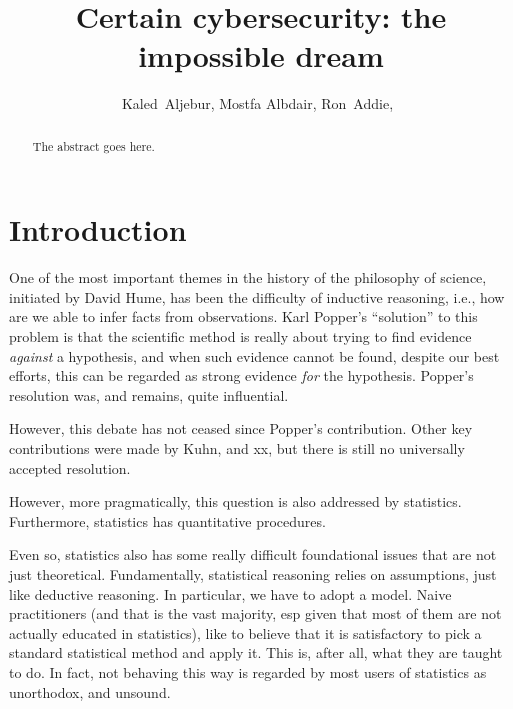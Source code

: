 \documentclass[journal]{IEEEtran}
\begin{document}
\title{Certain cybersecurity: the impossible dream}

\author{Kaled~Aljebur,
  Mostfa Albdair,
  Ron~Addie,~
}%


\maketitle


\begin{abstract}
  The abstract goes here.
\end{abstract}

\IEEEpeerreviewmaketitle



\section{Introduction}
One of the most important themes in the history of the philosophy of science,
initiated by David Hume, has been the difficulty of inductive reasoning,
i.e., how are we able to infer facts from observations.
Karl Popper's ``solution'' to this problem
is that the scientific method is really about trying to find evidence
  {\em against} a hypothesis, and when such evidence cannot be found, despite our best
efforts, this can be regarded as strong evidence {\em for} the hypothesis.
Popper's resolution was, and remains, quite influential.

However, this debate has not ceased since Popper's contribution.
Other key contributions were made by Kuhn, and xx,
but there is still no universally accepted resolution.

However, more pragmatically, this question is also addressed by
statistics. Furthermore, statistics has quantitative procedures.

Even so, statistics also has some really difficult foundational issues
that are not just theoretical. Fundamentally, statistical reasoning relies
on assumptions, just like deductive reasoning. In particular, we have
to adopt a model. Naive practitioners (and that is the vast majority,
esp given that most of them are not actually educated in statistics),
like to believe that it is satisfactory to pick a standard statistical
method and apply it. This is, after all, what they are taught to do. In
fact, not behaving this way is regarded by most users of statistics as
unorthodox, and unsound.
\end{document}
